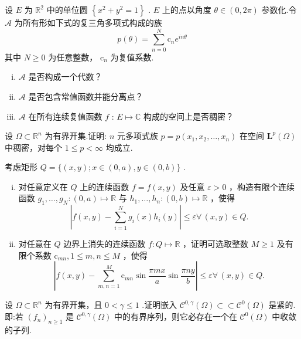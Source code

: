 \begin{rbhw}
设 $E$ 为 ${\mathbb{R}}^{2}$ 中的单位圆 $\left\{  {{x}^{2} + {y}^{2} = 1}\right\}$ . $E$ 上的点以角度 $\theta  \in  \left(  {0,{2\pi }}\right)$ 参数化.令 $\mathcal{A}$ 为所有形如下式的复三角多项式构成的族
\[
p\left( \theta \right)  = \mathop{\sum }\limits_{{n = 0}}^{N}{\mathrm{c}}_{n}{e}^{in\theta }
\]
其中 $N \geq  0$ 为任意整数， ${\mathrm{c}}_{n}$ 为复值系数.
\begin{enumerate}[(i)]
\item $\mathcal{A}$ 是否构成一个代数？
\item $\mathcal{A}$ 是否包含常值函数并能分离点？
\item $\mathcal{A}$ 在所有连续复值函数 $f$ : $E \mapsto  \mathbb{C}$ 构成的空间上是否稠密？
\end{enumerate}
\end{rbhw}

\begin{rbhw}
设 $\Omega  \subset  {\mathbb{R}}^{n}$ 为有界开集.证明: $n$ 元多项式族 $p = p\left( {{x}_{1},{x}_{2},\ldots ,{x}_{n}}\right)$ 在空间 ${\bm{L}}^{p}\left( \Omega \right)$ 中稠密，对每个 $1 \leq  p < \infty$ 均成立.
\end{rbhw}

\begin{rbhw}
考虑矩形 $Q = \{ \left( {x,y}\right) ;x \in  \left(  {0,a}\right)  ,y \in  \left(  {0,b}\right)  \}$ .
\begin{enumerate}[(i)]
\item 对任意定义在 $Q$ 上的连续函数 $f = f\left( {x,y}\right)$ 及任意 $\varepsilon  > 0$ ，构造有限个连续函数 ${g}_{1},\ldots ,{g}_{N} : \left(  {0,a}\right)   \mapsto  \mathbb{R}$ 与 ${h}_{1},\ldots ,{h}_{n} : \left(  {0,b}\right)   \mapsto  \mathbb{R}$ ，使得
\[
\left| {f\left( {x,y}\right)  - \mathop{\sum }\limits_{{i = 1}}^{N}{g}_{i}\left( x\right) {h}_{i}\left( y\right) }\right|  \leq  \varepsilon \forall\,\left( {x,y}\right)  \in  Q.
\]
\item 对任意在 $Q$ 边界上消失的连续函数 $f : Q \mapsto  \mathbb{R}$ ，证明可选取整数 $M \geq  1$ 及有限个系数 ${\mathrm{c}}_{mn},1 \leq  m,n \leq  M$ ，使得
\[
\left| {f\left( {x,y}\right)  - \mathop{\sum }\limits_{{m,n = 1}}^{M}{\mathrm{c}}_{mn}\sin \frac{\pi mx}{a}\sin \frac{\pi ny}{b}}\right|  \leq  \varepsilon \forall\,\left( {x,y}\right)  \in  Q.
\]
\end{enumerate}
\end{rbhw}

\begin{rbhw}
设 $\Omega  \subset  {\mathbb{R}}^{n}$ 为有界开集，且 $0 < \gamma  \leq  1$ .证明嵌入 ${\mathcal{C}}^{0,\gamma }\left( \Omega \right)  \subset   \subset  {\mathcal{C}}^{0}\left( \Omega \right)$ 是紧的.即:若 ${\left( {f}_{n}\right) }_{n \geq  1}$ 是 ${\mathcal{C}}^{0,\gamma }\left( \Omega \right)$ 中的有界序列，则它必存在一个在 ${\mathcal{C}}^{0}\left( \Omega \right)$ 中收敛的子列.
\end{rbhw}

